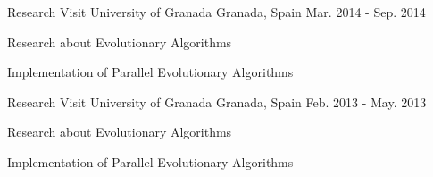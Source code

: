 


\begin{cventries}


\cventry
{Research Visit} %
{University of Granada} %
{Granada, Spain} %
{Mar. 2014 - Sep. 2014} %
{ %
\begin{cvitems}
\item {Research about Evolutionary Algorithms}
\item {Implementation of Parallel Evolutionary Algorithms}
\end{cvitems}
}


\cventry
{Research Visit} %
{University of Granada} %
{Granada, Spain} %
{Feb. 2013 - May. 2013} %
{ %
\begin{cvitems}
\item {Research about Evolutionary Algorithms}
\item {Implementation of Parallel Evolutionary Algorithms}
\end{cvitems}
}


\end{cventries}
